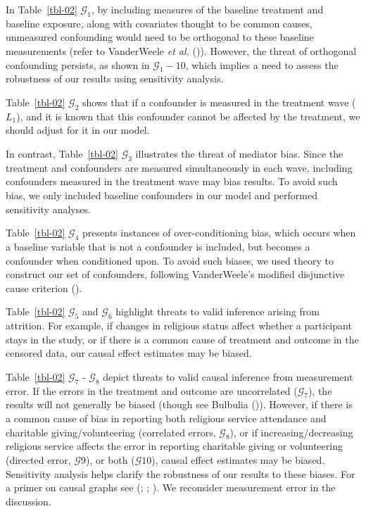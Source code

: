 \documentclass[
  single column]{article}
\begin{document}
In Table~\ref{tbl-02} \(\mathcal{G}_1\), by including measures of the
baseline treatment and baseline exposure, along with covariates thought
to be common causes, unmeasured confounding would need to be orthogonal
to these baseline measurements (refer to VanderWeele \emph{et al.}
()). However, the threat of
orthogonal confounding persists, as shown in \(\mathcal{G}_1-10\), which
implies a need to assess the robustness of our results using sensitivity
analysis.

Table~\ref{tbl-02} \(\mathcal{G}_2\) shows that if a confounder is
measured in the treatment wave (\(L_1\)), and it is known that this
confounder cannot be affected by the treatment, we should adjust for it
in our model.

In contrast, Table~\ref{tbl-02} \(\mathcal{G}_3\) illustrates the threat
of mediator bias. Since the treatment and confounders are measured
simultaneously in each wave, including confounders measured in the
treatment wave may bias results. To avoid such bias, we only included
baseline confounders in our model and performed sensitivity analyses.

Table~\ref{tbl-02} \(\mathcal{G}_4\) presents instances of
over-conditioning bias, which occurs when a baseline variable that is
not a confounder is included, but becomes a confounder when conditioned
upon. To avoid such biases, we used theory to construct our set of
confounders, following VanderWeele's modified disjunctive cause
criterion ().

Table~\ref{tbl-02} \(\mathcal{G}_5\) and \(\mathcal{G}_6\) highlight
threats to valid inference arising from attrition. For example, if
changes in religious status affect whether a participant stays in the
study, or if there is a common cause of treatment and outcome in the
censored data, our causal effect estimates may be biased.

Table~\ref{tbl-02} \(\mathcal{G}_7\) - \(\mathcal{G}_8\) depict threats
to valid causal inference from measurement error. If the errors in the
treatment and outcome are uncorrelated (\(\mathcal{G}_7\)), the results
will not generally be biased (though see Bulbulia
()). However, if there is a
common cause of bias in reporting both religious service attendance and
charitable giving/volunteering (correlated errors, \(\mathcal{G}_8\)),
or if increasing/decreasing religious service affects the error in
reporting charitable giving or volunteering (directed error,
\(\mathcal{G}9\)), or both (\(\mathcal{G}{10}\)), causal effect
estimates may be biased. Sensitivity analysis helps clarify the
robustness of our results to these biases. For a primer on causal graphs
see (;
;
). We reconsider
measurement error in the discussion.
\end{document}
